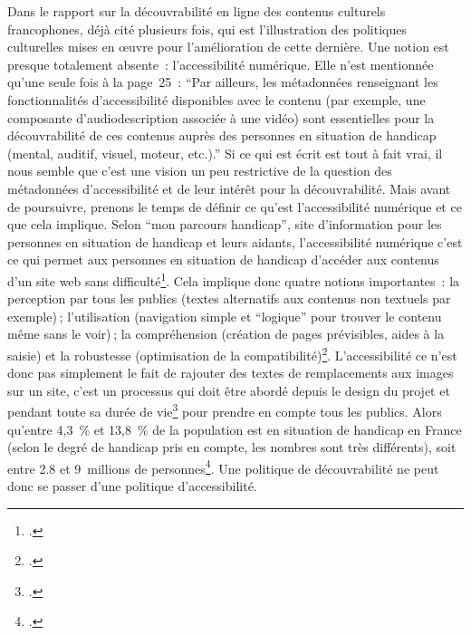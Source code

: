 Dans le rapport sur la découvrabilité en ligne des contenus culturels francophones, déjà cité plusieurs fois, qui est l’illustration des politiques culturelles mises en œuvre pour l’amélioration de cette dernière. Une notion est presque totalement absente : l’accessibilité numérique. Elle n’est mentionnée qu’une seule fois à la page 25 : \enquote{Par ailleurs, les métadonnées renseignant les fonctionnalités d’accessibilité disponibles avec le contenu (par exemple, une composante d’audiodescription associée à une vidéo) sont essentielles pour la découvrabilité de ces contenus auprès des personnes en situation de handicap (mental, auditif, visuel, moteur, etc.).} Si ce qui est écrit est tout à fait vrai, il nous semble que c’est une vision un peu restrictive de la question des métadonnées d’accessibilité et de leur intérêt pour la découvrabilité. Mais avant de poursuivre, prenons le temps de définir ce qu’est l’accessibilité numérique et ce que cela implique. Selon \enquote{mon parcours handicap}, site d’information pour les personnes en situation de handicap et leurs aidants, l’accessibilité numérique c’est ce qui permet aux personnes en situation de handicap d’accéder aux contenus d’un site web sans difficulté\footcite{noauthor_accessibilite_nodate}. Cela implique donc quatre notions importantes : la perception par tous les publics (textes alternatifs aux contenus non textuels par exemple) ; l’utilisation (navigation simple et \enquote{logique} pour trouver le contenu même sans le voir) ; la compréhension (création de pages prévisibles, aides à la saisie) et la robustesse (optimisation de la compatibilité)\footcite{noauthor_notion_nodate}. L’accessibilité ce n’est donc pas simplement le fait de rajouter des textes de remplacements aux images sur un site, c’est un processus qui doit être abordé depuis le design du projet et pendant toute sa durée de vie\footcite{noauthor_accessibilite_nodate} pour prendre en compte tous les publics. Alors qu’entre 4,3 \% et 13,8 \% de la population est en situation de handicap en France (selon le degré de handicap pris en compte, les nombres sont très différents), soit entre 2.8 et 9 millions de personnes\footcite{noauthor_personnes_2022}. Une politique de découvrabilité ne peut donc se passer d’une politique d’accessibilité.

